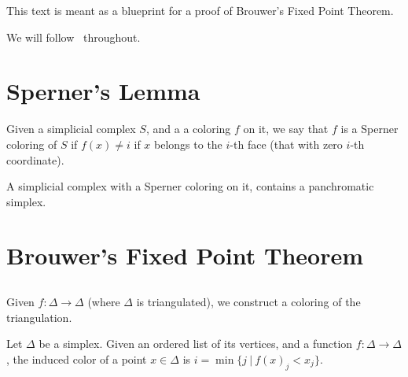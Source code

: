 \maketitle

\begin{remark}
  This text is meant as a blueprint for a proof of Brouwer's Fixed Point Theorem.
\end{remark}

We will follow~\cite{castellana2017} throughout.

\section{Sperner's Lemma}

\begin{definition}
\label{is_sperner_colouring}
\leanok
Given a simplicial complex $S$, and a a coloring $f$ on it, we say that $f$ is a Sperner coloring of $S$ if $f(x) \neq i$ if $x$ belongs to the $i$-th face (that with zero $i$-th coordinate).
\end{definition}


\begin{lemma}
  \label{sperner}
  \leanok
  A simplicial complex with a Sperner coloring on it, contains a panchromatic simplex.
\end{lemma}

\section{Brouwer's Fixed Point Theorem}

\subsection{}
Given $f\colon \Delta \to \Delta$ (where $\Delta$ is triangulated), we construct a coloring of the triangulation.

\begin{definition}
\label{def:induced_colouring}
Let $\Delta$ be a simplex. Given an ordered list of its vertices, and a function $f:\Delta \to \Delta$, the induced color of a point $x\in \Delta$ is $i=\min\{j ~|~ f(x)_j < x_j\}$.
\end{definition}

